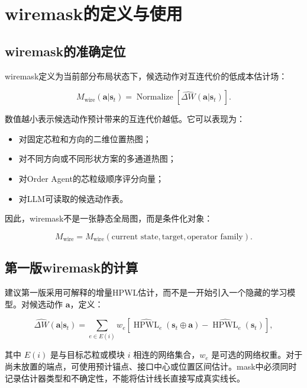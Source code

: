 \documentclass[UTF8,a4paper,12pt]{ctexart}
\newcommand{\state}{\boldsymbol{s}}
\newcommand{\action}{\boldsymbol{a}}
\newcommand{\wiremask}{M_{\mathrm{wire}}}
\begin{document}
\section{wiremask的定义与使用}

\subsection{wiremask的准确定位}

wiremask定义为当前部分布局状态下，候选动作对互连代价的低成本估计场：

\begin{equation}
\wiremask(\action|\state_t)
=\operatorname{Normalize}\left[\widehat{\Delta W}(\action|\state_t)\right].
\end{equation}

数值越小表示候选动作预计带来的互连代价越低。它可以表现为：

\begin{itemize}[leftmargin=2.5em]
  \item 对固定芯粒和方向的二维位置热图；
  \item 对不同方向或不同形状方案的多通道热图；
  \item 对Order Agent的芯粒级顺序评分向量；
  \item 对LLM可读取的候选动作表。
\end{itemize}

因此，wiremask不是一张静态全局图，而是条件化对象：

\begin{equation}
\wiremask=\wiremask(\text{current state},\text{target},\text{operator family}).
\end{equation}

\subsection{第一版wiremask的计算}

建议第一版采用可解释的增量HPWL估计，而不是一开始引入一个隐藏的学习模型。对候选动作 $\action$，定义：

\begin{equation}
\widehat{\Delta W}(\action|\state_t)
=\sum_{e\in E(i)}w_e\left[
\widehat{\operatorname{HPWL}}_e(\state_t\oplus\action)
-
\widehat{\operatorname{HPWL}}_e(\state_t)
\right],
\end{equation}

其中 $E(i)$ 是与目标芯粒或模块 $i$ 相连的网络集合，$w_e$ 是可选的网络权重。对于尚未放置的端点，可使用预计锚点、接口中心或位置区间估计。mask中必须同时记录估计器类型和不确定性，不能将估计线长直接写成真实线长。
\end{document}
